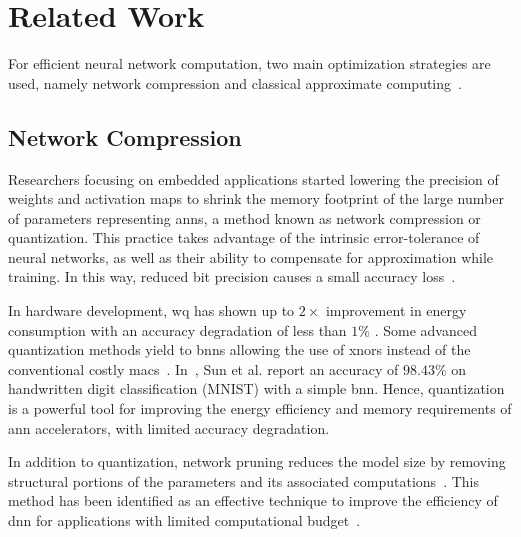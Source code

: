 \section{Related Work}
\label{sec:related_work}
For efficient neural network computation, two main optimization strategies are used, namely network compression and classical approximate computing~\cite{bouvier2019spiking}.

\subsection{Network Compression}
Researchers focusing on embedded applications started lowering the precision of weights and activation maps to shrink the memory footprint of the large number of parameters representing \glspl{ann}, a method known as network compression or quantization. This practice takes advantage of the intrinsic error-tolerance of neural networks, as well as their ability to compensate for approximation while training. In this way, reduced bit precision causes a small accuracy loss~\cite{courbariaux2015binaryconnect, han2015deep, hubara2017quantized, rastegari2016xnor}.

In hardware development, \gls{wq} has shown up to $2\times$ improvement in energy consumption with an accuracy degradation of less than $1\%$ \cite{moons20160, whatmough201714}. Some advanced quantization methods yield to \glspl{bnn} allowing the use of \glspl{xnor} instead of the conventional costly \glspl{mac}~\cite{rastegari2016xnor}. In~\cite{sun2018xnor}, Sun et al. report an accuracy of $98.43\%$ on handwritten digit classification (MNIST) with a simple \gls{bnn}. Hence, quantization is a powerful tool for improving the energy efficiency and memory requirements of \gls{ann} accelerators, with limited accuracy degradation.

In addition to quantization, network pruning reduces the model size by removing structural portions of the parameters and its associated computations~\cite{lecun1989optimal,hassibi1992second}. This method has been identified as an effective technique to improve the efficiency of \gls{dnn} for applications with limited computational budget~\cite{molchanov2016pruning,li2016pruning, liu2018rethinking}.

